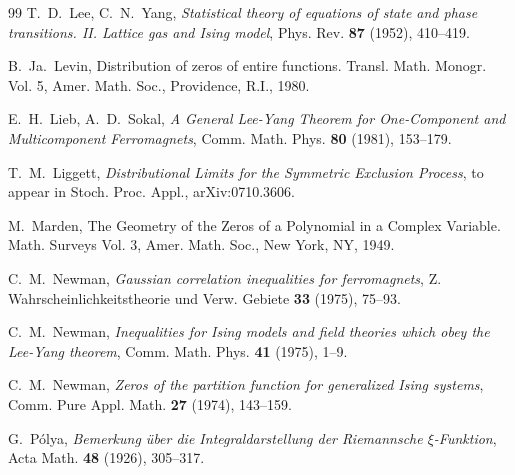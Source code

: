 \documentclass[10pt,reqno]{amsart}
\theoremstyle{plain}
\theoremstyle{definition}
\theoremstyle{remark}
\numberwithin{equation}{section}
\begin{document}
\begin{thebibliography}{99}
T.~D.~Lee, C.~N.~Yang, {\em Statistical theory of equations of 
state and phase transitions. II. 
Lattice gas and Ising model}, Phys. Rev. {\bf 87} (1952), 410--419. 

B.~Ja.~Levin, Distribution of zeros of entire functions. 
Transl. Math. Monogr. Vol. 5, Amer. Math. Soc., Providence, R.I., 1980. 

E.~H.~Lieb, A.~D.~Sokal, {\em A General Lee-Yang Theorem for One-Component and 
Multicomponent Ferromagnets}, Comm. Math. Phys. {\bf 80} (1981), 153--179.

T.~M.~Liggett, {\em Distributional Limits for the Symmetric Exclusion 
Process}, to appear in Stoch. Proc. Appl., arXiv:0710.3606.



M.~Marden, The Geometry of the Zeros of a Polynomial in a Complex
Variable. Math. Sur\-veys Vol. 3, Amer. Math. Soc., New York, NY,
1949.

C.~M.~Newman, {\em Gaussian correlation inequalities for ferromagnets}, 
Z. Wahrscheinlichkeitstheorie und Verw. Gebiete {\bf 33} (1975), 75--93. 

C.~M.~Newman, {\em Inequalities for Ising models and field theories which 
obey the Lee-Yang theorem}, Comm. Math. Phys. {\bf 41} (1975), 1--9. 

C.~M.~Newman, {\em Zeros of the partition function for generalized Ising 
systems}, Comm. Pure Appl. Math. {\bf 27} (1974), 143--159.



G.~P\'olya, {\em Bemerkung \"uber die Integraldarstellung der Riemannsche 
$\xi$-Funktion}, Acta Math. {\bf 48} (1926), 305--317.


\end{thebibliography}
\end{document}
